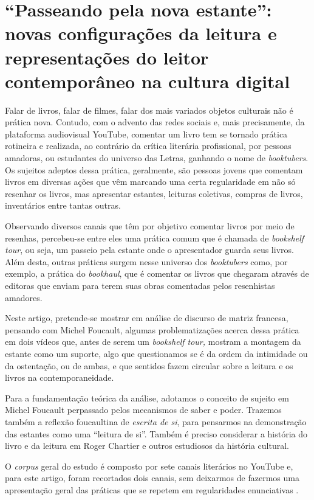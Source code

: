 \section{\enquote{Passeando pela nova estante}: novas configurações da leitura e representações do leitor contemporâneo na cultura digital}\label{Sec-passeando}

 Falar de livros, falar de filmes, falar dos mais variados objetos
culturais não é prática nova. Contudo, com o advento das redes sociais
e, mais precisamente, da plataforma audiovisual YouTube, comentar um
livro tem se tornado prática rotineira e realizada, ao contrário da
crítica literária profissional, por pessoas amadoras, ou estudantes do
universo das Letras, ganhando o nome de \textit{booktubers}. Os sujeitos
adeptos dessa prática, geralmente, são pessoas jovens que comentam
livros em diversas ações que vêm marcando uma certa regularidade em não
só resenhar os livros, mas apresentar estantes, leituras coletivas,
compras de livros, inventários entre tantas outras.

Observando diversos canais que têm por objetivo comentar livros por meio
de resenhas, percebeu-se entre eles uma prática comum que é chamada de
\textit{bookshelf tour}, ou seja, um passeio pela estante onde o
apresentador guarda seus livros. Além desta, outras práticas surgem
nesse universo dos \textit{booktubers} como, por exemplo, a prática do
\textit{bookhaul}, que é comentar os livros que chegaram através de
editoras que enviam para terem suas obras comentadas pelos resenhistas
amadores.

Neste artigo, pretende-se mostrar em análise de discurso de matriz
francesa, pensando com Michel Foucault, algumas problematizações acerca
dessa prática em dois vídeos que, antes de serem um \textit{bookshelf
tour,} mostram a montagem da estante como um suporte, algo que
questionamos se é da ordem da intimidade ou da ostentação, ou de ambas,
e que sentidos fazem circular sobre a leitura e os livros na
contemporaneidade.

Para a fundamentação teórica da análise, adotamos o conceito de sujeito
em Michel Foucault perpassado pelos mecanismos de saber e poder.
Trazemos também a reflexão foucaultina de \textit{escrita de si}, para
pensarmos na demonstração das estantes como uma \enquote{leitura de si}.
Também é preciso considerar a história do livro e da leitura em Roger
Chartier e outros estudiosos da história cultural.

O \textit{corpus} geral do estudo é composto por sete canais literários no
YouTube e, para este artigo, foram recortados dois canais, sem deixarmos
de fazermos uma apresentação geral das práticas que se repetem em
regularidades enunciativas \cite{foucault2009arqueologia}.


